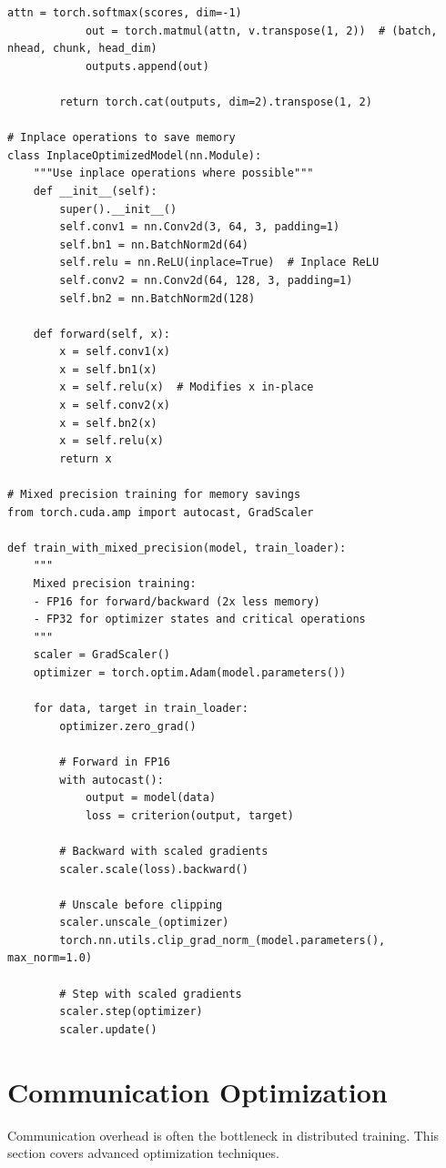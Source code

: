 \begin{lstlisting}[style=python, caption=Techniques for reducing activation memory]
            attn = torch.softmax(scores, dim=-1)
            out = torch.matmul(attn, v.transpose(1, 2))  # (batch, nhead, chunk, head_dim)
            outputs.append(out)

        return torch.cat(outputs, dim=2).transpose(1, 2)

# Inplace operations to save memory
class InplaceOptimizedModel(nn.Module):
    """Use inplace operations where possible"""
    def __init__(self):
        super().__init__()
        self.conv1 = nn.Conv2d(3, 64, 3, padding=1)
        self.bn1 = nn.BatchNorm2d(64)
        self.relu = nn.ReLU(inplace=True)  # Inplace ReLU
        self.conv2 = nn.Conv2d(64, 128, 3, padding=1)
        self.bn2 = nn.BatchNorm2d(128)

    def forward(self, x):
        x = self.conv1(x)
        x = self.bn1(x)
        x = self.relu(x)  # Modifies x in-place
        x = self.conv2(x)
        x = self.bn2(x)
        x = self.relu(x)
        return x

# Mixed precision training for memory savings
from torch.cuda.amp import autocast, GradScaler

def train_with_mixed_precision(model, train_loader):
    """
    Mixed precision training:
    - FP16 for forward/backward (2x less memory)
    - FP32 for optimizer states and critical operations
    """
    scaler = GradScaler()
    optimizer = torch.optim.Adam(model.parameters())

    for data, target in train_loader:
        optimizer.zero_grad()

        # Forward in FP16
        with autocast():
            output = model(data)
            loss = criterion(output, target)

        # Backward with scaled gradients
        scaler.scale(loss).backward()

        # Unscale before clipping
        scaler.unscale_(optimizer)
        torch.nn.utils.clip_grad_norm_(model.parameters(), max_norm=1.0)

        # Step with scaled gradients
        scaler.step(optimizer)
        scaler.update()
\end{lstlisting}

\section{Communication Optimization}

Communication overhead is often the bottleneck in distributed training. This section covers advanced optimization techniques.

